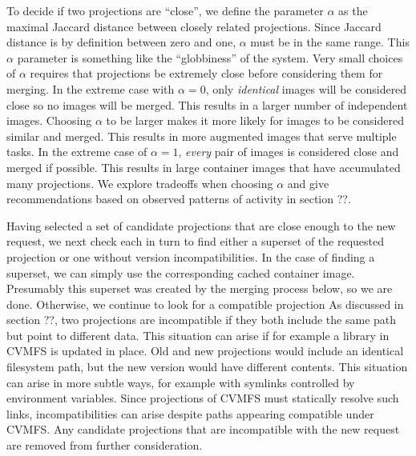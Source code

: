 \documentclass[sigconf]{acmart}
\begin{document}
To decide if two projections are ``close'',
we define the parameter $\alpha$ as the maximal Jaccard distance between closely related projections.
Since Jaccard distance is by definition between zero and one,
$\alpha$ must be in the same range.
This $\alpha$ parameter is something like the ``globbiness'' of the system.
Very small choices of $\alpha$ requires that projections be extremely close before considering them for merging.
In the extreme case with $\alpha = 0$,
only \emph{identical} images will be considered close so no images will be merged.
This results in a larger number of independent images.
Choosing $\alpha$ to be larger makes it more likely for images to be considered similar and merged.
This results in more augmented images that serve multiple tasks.
In the extreme case of $\alpha = 1$,
\emph{every} pair of images is considered close and merged if possible.
This results in large container images that have accumulated many projections.
We explore tradeoffs when choosing $\alpha$ and give recommendations based on observed patterns of activity in section ??.

Having selected a set of candidate projections that are close enough to the new request,
we next check each in turn to find either a superset of the requested projection or one without version incompatibilities.
In the case of finding a superset,
we can simply use the corresponding cached container image.
Presumably this superset was created by the merging process below,
so we are done.
Otherwise, we continue to look for a compatible projection
As discussed in section ??,
two projections are incompatible if they both include the same path but point to different data.
This situation can arise if for example a library in CVMFS is updated in place.
Old and new projections would include an identical filesystem path,
but the new version would have different contents.
This situation can arise in more subtle ways,
for example with symlinks controlled by environment variables.
Since projections of CVMFS must statically resolve such links,
incompatibilities can arise despite paths appearing compatible under CVMFS.
Any candidate projections that are incompatible with the new request are removed from further consideration.
\end{document}
